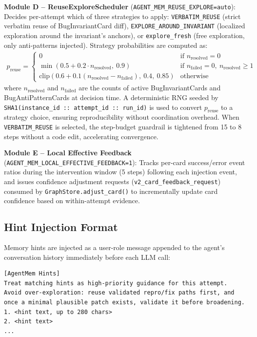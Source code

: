 \documentclass{article}
\begin{document}
\textbf{Module D -- ReuseExploreScheduler} (\texttt{AGENT\_MEM\_REUSE\_EXPLORE=auto}): Decides per-attempt which of three strategies to apply: \texttt{VERBATIM\_REUSE} (strict verbatim reuse of BugInvariantCard diff), \texttt{EXPLORE\_AROUND\_INVARIANT} (localized exploration around the invariant's anchors), or \texttt{explore\_fresh} (free exploration, only anti-patterns injected). Strategy probabilities are computed as:
\begin{align}
p_{\text{reuse}} = \begin{cases}
0 & \text{if } n_{\text{resolved}} = 0 \\
\min(0.5 + 0.2 \cdot n_{\text{resolved}},\ 0.9) & \text{if } n_{\text{failed}} = 0,\ n_{\text{resolved}} \geq 1 \\
\text{clip}(0.6 + 0.1(n_{\text{resolved}} - n_{\text{failed}}),\ 0.4,\ 0.85) & \text{otherwise}
\end{cases}
\end{align}
where $n_{\text{resolved}}$ and $n_{\text{failed}}$ are the counts of active BugInvariantCards and BugAntiPatternCards at decision time. A deterministic RNG seeded by \texttt{SHA1(instance\_id :: attempt\_id :: run\_id)} is used to convert $p_{\text{reuse}}$ to a strategy choice, ensuring reproducibility without coordination overhead. When \texttt{VERBATIM\_REUSE} is selected, the step-budget guardrail is tightened from 15 to 8 steps without a code edit, accelerating convergence.

\textbf{Module E -- Local Effective Feedback} (\texttt{AGENT\_MEM\_LOCAL\_EFFECTIVE\_FEEDBACK=1}): Tracks per-card success/error event ratios during the intervention window (5 steps) following each injection event, and issues confidence adjustment requests (\texttt{v2\_card\_feedback\_request}) consumed by \texttt{GraphStore.adjust\_card()} to incrementally update card confidence based on within-attempt evidence.

\subsection{Hint Injection Format}

Memory hints are injected as a user-role message appended to the agent's conversation history immediately before each LLM call:

\begin{verbatim}
[AgentMem Hints]
Treat matching hints as high-priority guidance for this attempt.
Avoid over-exploration: reuse validated repro/fix paths first, and
once a minimal plausible patch exists, validate it before broadening.
1. <hint text, up to 280 chars>
2. <hint text>
...
\end{verbatim}
\end{document}
